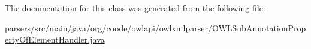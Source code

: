 The documentation for this class was generated from the following file\-:\begin{DoxyCompactItemize}
\item 
parsers/src/main/java/org/coode/owlapi/owlxmlparser/\hyperlink{_o_w_l_sub_annotation_property_of_element_handler_8java}{O\-W\-L\-Sub\-Annotation\-Property\-Of\-Element\-Handler.\-java}\end{DoxyCompactItemize}
